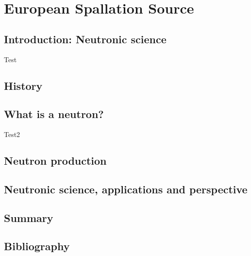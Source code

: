 \chapter{European Spallation Source}
\cleardoublepage

\minitoc

\section{Introduction: Neutronic science}
\begin{refsection}
	\label{ch1:Introduction}
	Test \cite{Mason2005}

	\section{History}

	\section{What is a neutron?}
	\label{ch1:s:Neutron}
	Test2 \cite{osti_656719}

	\section{Neutron production}

	\section{Neutronic science, applications and perspective}

	\section{Summary}
	\label{ch1:Summary}

	\cleardoublepage
	\section{Bibliography}
	\label{ch1:bib}
	\printbibliography[heading=subbibliography]
\end{refsection}